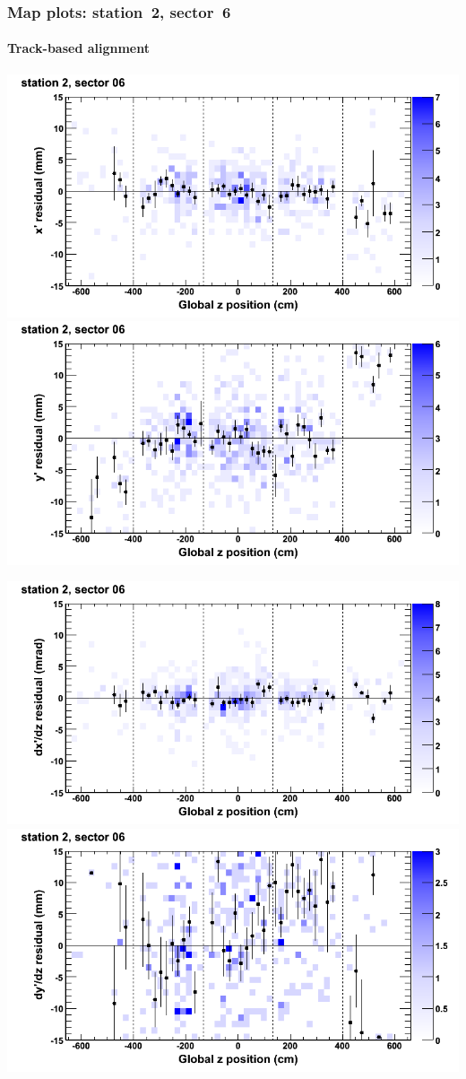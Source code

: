 \documentclass[compress]{beamer}
\begin{document}
\begin{frame}
\frametitle{Map plots: station~2, sector~6}
\framesubtitle{Track-based alignment}
\includegraphics[width=0.5\linewidth]{mapplots_re05/DTvsz_st2sec06_x.png}
\includegraphics[width=0.5\linewidth]{mapplots_re05/DTvsz_st2sec06_y.png}

\includegraphics[width=0.5\linewidth]{mapplots_re05/DTvsz_st2sec06_dxdz.png}
\includegraphics[width=0.5\linewidth]{mapplots_re05/DTvsz_st2sec06_dydz.png}
\end{frame}
\end{document}
